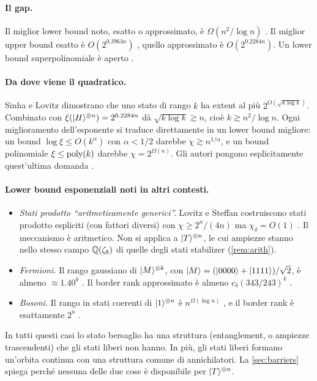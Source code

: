 \paragraph{Il gap.} Il miglior lower bound noto, esatto o approssimato, è $\Omega(n^2/\log n)$ \cite{MT23,SL26}. Il miglior upper bound esatto è $O(2^{0.3963n})$ \cite{QPG21}, quello approssimato è $O(2^{0.2284n})$. Un lower bound superpolinomiale è aperto \cite{CC26,SL26}.

\paragraph{Da dove viene il quadratico.} Sinha e Lovitz dimostrano che uno stato di rango $k$ ha extent al più $2^{O(\sqrt{k\log k})}$. Combinato con $\xi(\lvert H\rangle^{\otimes n})=2^{0.2284n}$ dà $\sqrt{k\log k}\gtrsim n$, cioè $k\gtrsim n^2/\log n$. Ogni miglioramento dell'esponente si traduce direttamente in un lower bound migliore: un bound $\log\xi\le O(k^{\alpha})$ con $\alpha<1/2$ darebbe $\chi\gtrsim n^{1/\alpha}$, e un bound polinomiale $\xi\le\mathrm{poly}(k)$ darebbe $\chi=2^{\Omega(n)}$. Gli autori pongono esplicitamente quest'ultima domanda \cite{SL26}.

\paragraph{Lower bound esponenziali noti in altri contesti.}
\begin{itemize}[leftmargin=1.5em]
\item \emph{Stati prodotto ``aritmeticamente generici''.} Lovitz e Steffan costruiscono stati prodotto espliciti (con fattori diversi) con $\chi\ge 2^n/(4n)$ ma $\chi_\delta=O(1)$ \cite{LS22}. Il meccanismo è aritmetico. Non si applica a $\lvert T\rangle^{\otimes n}$, le cui ampiezze stanno nello stesso campo $\mathbb Q(\zeta_8)$ di quelle degli stati stabilizer (\cref{rem:arith}).
\item \emph{Fermioni.} Il rango gaussiano di $\lvert M\rangle^{\otimes k}$, con $\lvert M\rangle=(\lvert 0000\rangle+\lvert 1111\rangle)/\sqrt2$, è almeno $\approx1.40^k$ \cite{RS26}. Il border rank approssimato è almeno $c_\delta(343/243)^k$ \cite{WWLL26}.
\item \emph{Bosoni.} Il rango in stati coerenti di $\lvert 1\rangle^{\otimes n}$ è $n^{\Omega(\log n)}$ \cite{CC26}, e il border rank è esattamente $2^n$ \cite{RS26}.
\end{itemize}
In tutti questi casi lo stato bersaglio ha una struttura (entanglement, o ampiezze trascendenti) che gli stati liberi non hanno. In più, gli stati liberi formano un'orbita continua con una struttura comune di annichilatori. La \cref{sec:barriers} spiega perché nessuna delle due cose è disponibile per $\lvert T\rangle^{\otimes n}$.
